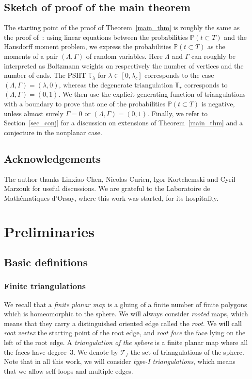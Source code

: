 \documentclass[10pt]{amsart}
\theoremstyle{definition}\newtheorem{defi}[theo]{Definition}\newtheorem{rema}[theo]{Remark}\newtheorem{exam}[theo]{Example}\newtheorem{exem}[theo]{Example}\newtheorem{nota}[theo]{Notation}
\newcommand{\T}{\mathcal{T}}
\newcommand{\TT}{\mathbb{T}}
\renewcommand{\P}{\mathbb{P}}
\begin{document}
\subsection*{Sketch of proof of the main theorem} The starting point of the proof of Theorem~\ref{main_thm} is roughly the same as the proof of~\cite[Theorem~2]{BL19}: using linear equations between the probabilities $\P(t \subset T)$ and the Hausdorff moment problem, we express the probabilities $\P (t \subset T )$ as the moments of a pair $(\Lambda, \Gamma)$ of random variables. Here $\Lambda$ and $\Gamma$ can roughly be interpreted as Boltzmann weights on respectively the number of vertices and the number of ends. The PSHT $\TT_{\lambda}$ for $\lambda \in [0,\lambda_c]$ corresponds to the case $(\Lambda, \Gamma)=(\lambda,0)$, whereas the degenerate triangulation $\TT_{\star}$ corresponds to $(\Lambda, \Gamma)=(0,1)$. We then use the explicit generating function of triangulations with a boundary to prove that one of the probabilities $\P (t \subset T)$ is negative, unless almost surely $\Gamma=0$ or $(\Lambda, \Gamma)=(0,1)$. Finally, we refer to Section~\ref{sec_conj} for a discussion on extensions of Theorem~\ref{main_thm} and a conjecture in the nonplanar case.


\subsection*{Acknowledgements}
The author thanks Linxiao Chen, Nicolas Curien, Igor Kortchemski and Cyril Marzouk for useful discussions. We are grateful to the Laboratoire de Mathématiques d'Orsay, where this work was started, for its hospitality.

\section{Preliminaries}\label{sec_prelim}

\subsection{Basic definitions}\label{subsec_defns}

\subsubsection*{Finite triangulations}
We recall that a \emph{finite planar map} is a gluing of a finite number of finite polygons which is homeomorphic to the sphere. We will always consider \emph{rooted} maps, which means that they carry a distinguished oriented edge called the \emph{root}. We will call \emph{root vertex} the starting point of the root edge, and \emph{root face} the face lying on the left of the root edge. A \emph{triangulation of the sphere} is a finite planar map where all the faces have degree~$3$. We denote by $\T_f$ the set of triangulations of the sphere. Note that in all this work, we will consider \emph{type-I triangulations}, which means that we allow self-loops and multiple edges.
\end{document}
